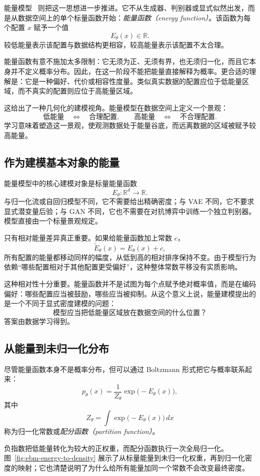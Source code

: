 能量模型~\cite{lecun2006tutorial} 则把这一思想进一步推进。它不从生成器、判别器或显式似然出发，而是从数据空间上的单个标量函数开始：\emph{能量函数（energy function）}。该函数为每个配置 $x$ 赋予一个值
\[
E_\theta(x)\in\mathbb{R}.
\]
较低能量表示该配置与数据结构更相容，较高能量表示该配置不太合理。

能量函数有意不施加太多限制：它无须为正、无须有界，也无须归一化，而且它本身并不定义概率分布。因此，在这一阶段不能把能量直接解释为概率。更合适的理解是：它是一种偏好、代价或相容性度量。类似真实数据的配置应位于低能量区域，而不真实的配置则应位于高能量区域。

这给出了一种几何化的建模视角。能量模型在数据空间上定义一个景观：
\[
\text{低能量}
\quad\Longleftrightarrow\quad
\text{合理配置},
\qquad
\text{高能量}
\quad\Longleftrightarrow\quad
\text{不合理配置}.
\]
学习意味着塑造这一景观，使观测数据处于能量谷底，而远离数据的区域被赋予较高能量。

\subsection{作为建模基本对象的能量}

能量模型中的核心建模对象是标量能量函数
\[
E_\theta:\mathbb{R}^d\to\mathbb{R}.
\]
与归一化流或自回归模型不同，它不需要给出精确密度；与 VAE 不同，它不要求显式潜变量后验；与 GAN 不同，它也不需要在对抗博弈中训练一个独立判别器。模型直接由一个标量景观规定。

只有相对能量差异真正重要。如果给能量函数加上常数 $c$，
\[
\tilde{E}_\theta(x)=E_\theta(x)+c,
\]
所有配置的能量都移动同样的幅度，从低到高的相对排序保持不变。由于模型行为依赖“哪些配置相对于其他配置更受偏好”，这种整体常数平移没有实质影响。

这种相对性十分重要。能量函数并不是试图为每个点赋予绝对概率值，而是在编码偏好：哪些配置应当被鼓励，哪些应当被抑制。从这个意义上说，能量建模提出的是一个不同于显式密度建模的问题：
\[
\textit{模型应当把低能量区域放在数据空间的什么位置？}
\]
答案由数据学习得到。

\subsection{从能量到未归一化分布}

尽管能量函数本身不是概率分布，但可以通过 Boltzmann 形式把它与概率联系起来：
\[
p_\theta(x)
=
\frac{1}{Z_\theta}
\exp\big(-E_\theta(x)\big),
\]
其中
\[
Z_\theta
=
\int
\exp\big(-E_\theta(x)\big)\,dx
\]
称为归一化常数或\emph{配分函数（partition function）}。

负指数把低能量转化为较大的正权重，而配分函数执行一次全局归一化。图~\ref{fig:ebm-energy-to-density} 展示了从标量能量到未归一化权重，再到归一化密度的映射；它也清楚说明了为什么给所有能量加同一个常数不会改变最终密度。

